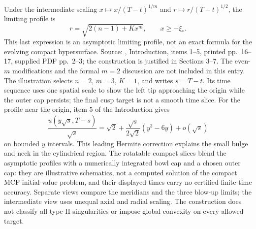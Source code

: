 \begin{example}
Under the intermediate scaling $x\mapsto x/(T-t)^{1/m}$ and $r\mapsto r/(T-t)^{1/2}$, the limiting profile is
\[
 r=\sqrt{2(n-1)+Kx^m},\qquad x\geq-\xi_*.
\]
This last expression is an asymptotic limiting profile, not an exact formula for the evolving compact hypersurface. Source: \cite{CatAV97}, Introduction, items 1--5, printed pp.~16--17, supplied PDF pp.~2--3; the construction is justified in Sections 3--7. The even-$m$ modifications and the formal $m=2$ discussion are not included in this entry. The illustration selects $n=2$, $m=3$, $K=1$, and writes $s=T-t$. Its time sequence uses one spatial scale to show the left tip approaching the origin while the outer cap persists; the final cusp target is not a smooth time slice. For the profile near the origin, item 5 of the Introduction gives
\[
 \frac{u(y\sqrt{s},T-s)}{\sqrt{s}}
 =\sqrt{2}+\frac{\sqrt{s}}{2\sqrt{2}}(y^3-6y)+o(\sqrt{s})
\]
on bounded $y$ intervals. This leading Hermite correction explains the small bulge and neck in the cylindrical region. The rotatable compact slices blend the asymptotic profiles with a numerically integrated bowl cap and a chosen outer cap: they are illustrative schematics, not a computed solution of the compact MCF initial-value problem, and their displayed times carry no certified finite-time accuracy. Separate views compare the meridians and the three blow-up limits; the intermediate view uses unequal axial and radial scaling. The construction does not classify all type-II singularities or impose global convexity on every allowed target.
\end{example}


